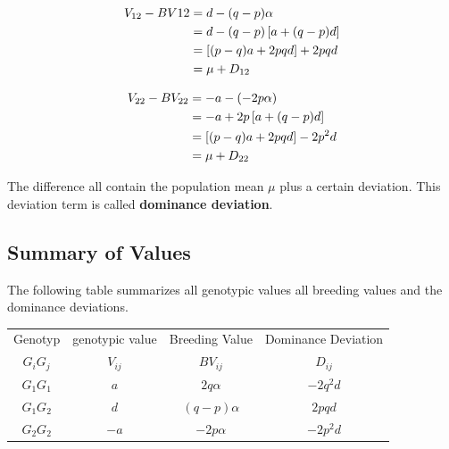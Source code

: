 \documentclass[
]{book}
\theoremstyle{definition}
\theoremstyle{definition}
\theoremstyle{definition}
\theoremstyle{remark}
\begin{document}
\begin{align}
  V_{12} - BV{12} &=   d - (q-p)\alpha \notag \\
                   &=   d - (q-p)\left[ a + (q-p)d \right] \notag \\
                   &=   \left[(p-q)a + 2pqd\right] + 2pqd \notag \\
                   &=   \mu + D_{12}
  \end{align}

\begin{align}
  V_{22} - BV_{22} &=   -a - (-2p\alpha) \notag \\
                   &=   -a + 2p\left[ a + (q-p)d \right] \notag \\
                   &=   \left[(p-q)a + 2pqd\right] - 2p^2d \notag \\
                   &=   \mu + D_{22} \notag
  \end{align}

The difference all contain the population mean \(\mu\) plus a certain deviation. This deviation term is called \textbf{dominance deviation}.

\hypertarget{summary-of-values}{%
\subsection{Summary of Values}\label{summary-of-values}}

The following table summarizes all genotypic values all breeding values and the dominance deviations.

\vspace{5ex}

\begin{center} 
\begin{tabular}{|c|c|c|c|}
   \hline
   Genotyp  &  genotypic value     &  Breeding Value    &  Dominance Deviation \\
   $G_iG_j$ &  $V_{ij}$            &  $BV_{ij}$         &  $D_{ij}$           \\
   \hline
   $G_1G_1$ &  $a$                 &  $2q\alpha$        &  $-2q^2d$          \\
   \hline
   $G_1G_2$ &  $d$                 &  $(q-p)\alpha$     & $2pqd$             \\
   \hline
   $G_2G_2$ &  $-a$                &  $-2p\alpha$       & $-2p^2d$           \\
   \hline
\end{tabular}
\end{center}
\end{document}

